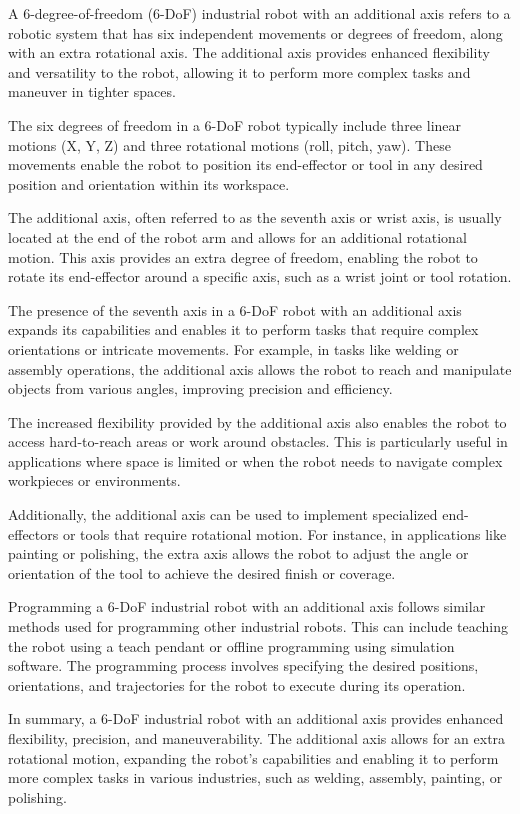 A 6-degree-of-freedom (6-DoF) industrial robot with an additional axis refers to a robotic system that has six independent movements or degrees of freedom, along with an extra rotational axis. The additional axis provides enhanced flexibility and versatility to the robot, allowing it to perform more complex tasks and maneuver in tighter spaces.

The six degrees of freedom in a 6-DoF robot typically include three linear motions (X, Y, Z) and three rotational motions (roll, pitch, yaw). These movements enable the robot to position its end-effector or tool in any desired position and orientation within its workspace.

The additional axis, often referred to as the seventh axis or wrist axis, is usually located at the end of the robot arm and allows for an additional rotational motion. This axis provides an extra degree of freedom, enabling the robot to rotate its end-effector around a specific axis, such as a wrist joint or tool rotation.

The presence of the seventh axis in a 6-DoF robot with an additional axis expands its capabilities and enables it to perform tasks that require complex orientations or intricate movements. For example, in tasks like welding or assembly operations, the additional axis allows the robot to reach and manipulate objects from various angles, improving precision and efficiency.

The increased flexibility provided by the additional axis also enables the robot to access hard-to-reach areas or work around obstacles. This is particularly useful in applications where space is limited or when the robot needs to navigate complex workpieces or environments.

Additionally, the additional axis can be used to implement specialized end-effectors or tools that require rotational motion. For instance, in applications like painting or polishing, the extra axis allows the robot to adjust the angle or orientation of the tool to achieve the desired finish or coverage.

Programming a 6-DoF industrial robot with an additional axis follows similar methods used for programming other industrial robots. This can include teaching the robot using a teach pendant or offline programming using simulation software. The programming process involves specifying the desired positions, orientations, and trajectories for the robot to execute during its operation.

In summary, a 6-DoF industrial robot with an additional axis provides enhanced flexibility, precision, and maneuverability. The additional axis allows for an extra rotational motion, expanding the robot's capabilities and enabling it to perform more complex tasks in various industries, such as welding, assembly, painting, or polishing.

